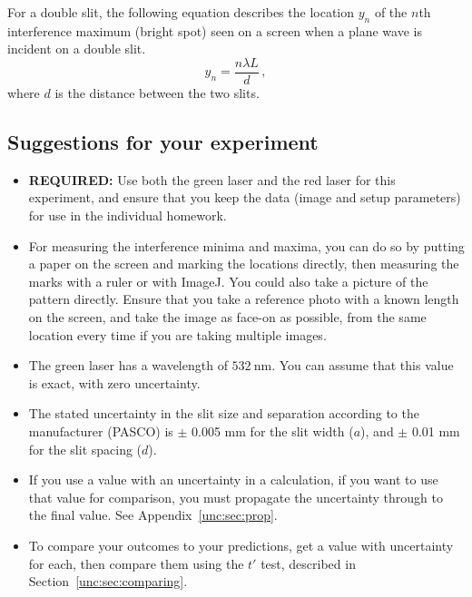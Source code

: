 For a double slit, the following equation describes the location $y_n$ of the $n$th interference maximum (bright spot) seen on a screen when a plane wave is incident on a double slit.
\begin{equation}
y_n = \frac{n \lambda L}{d} \,,
\end{equation}
where $d$ is the distance between the two slits.

\subsection{Suggestions for your experiment}

\begin{itemize}
	
	\item \textbf{REQUIRED:} Use both the green laser and the red laser for this experiment, and ensure that you keep the data (image and setup parameters) for use in the individual homework.
	
	\item For measuring the interference minima and maxima, you can do so by putting a paper on the screen and marking the locations directly, then measuring the marks with a ruler or with ImageJ. You could also take a picture of the pattern directly. Ensure that you take a reference photo with a known length on the screen, and take the image as face-on as possible, from the same location every time if you are taking multiple images.
	
	\item The green laser has a wavelength of $532\:$nm. You can assume that this value is exact, with zero uncertainty.
	
	\item The stated uncertainty in the slit size and separation according to the manufacturer (PASCO) is $\pm$ 0.005 mm for the slit width ($a$), and $\pm$ 0.01 mm for the slit spacing ($d$).
	
	\item If you use a value with an uncertainty in a calculation, if you want to use that value for comparison, you must propagate the uncertainty through to the final value. See Appendix~\ref{unc:sec:prop}.
	
	\item To compare your outcomes to your predictions, get a value with uncertainty for each, then compare them using the $t'$ test, described in Section~\ref{unc:sec:comparing}.
\end{itemize}

